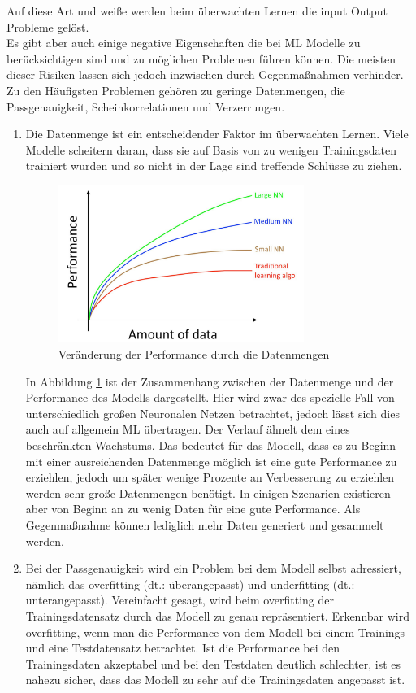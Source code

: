 \begin{onehalfspace}
        Auf diese Art und weiße werden beim überwachten Lernen die input Output Probleme gelöst. \cite{Ng2018}
        \\
        Es gibt aber auch einige negative Eigenschaften die bei \ac{ML} Modelle zu berücksichtigen sind und zu möglichen Problemen führen können. Die meisten dieser Risiken lassen sich jedoch inzwischen durch Gegenmaßnahmen verhinder. Zu den Häufigsten Problemen gehören zu geringe Datenmengen, die Passgenauigkeit, Scheinkorrelationen und Verzerrungen. 
        \begin{enumerate}
            \item Die Datenmenge ist ein entscheidender Faktor im überwachten Lernen. Viele Modelle scheitern daran, dass sie auf Basis von zu wenigen Trainingsdaten trainiert wurden und so nicht in der Lage sind treffende Schlüsse zu ziehen. \cite{Datenkommission2019}\cite{Ng2018}
            \begin{figure}[h]
                \centering
                \includegraphics[width = 8cm]{Bilder/Datenmenge.png}
                \caption{Veränderung der Performance durch die Datenmengen \cite{Ng2018}}
                \label{fig:Datavolume}
            \end{figure} 
            In Abbildung \ref*{fig:Datavolume} ist der Zusammenhang zwischen der Datenmenge und der Performance des Modells dargestellt. Hier wird zwar des spezielle Fall von unterschiedlich großen Neuronalen Netzen betrachtet, jedoch lässt sich dies auch auf allgemein \ac*{ML} übertragen. Der Verlauf ähnelt dem eines beschränkten Wachstums. Das bedeutet für das Modell, dass es zu Beginn mit einer ausreichenden Datenmenge möglich ist eine gute Performance zu erziehlen, jedoch um später wenige Prozente an Verbesserung zu erziehlen werden sehr große Datenmengen benötigt.\cite{Ng2018} In einigen Szenarien existieren aber von Beginn an zu wenig Daten für eine gute Performance. Als Gegenmaßnahme können lediglich mehr Daten generiert und gesammelt werden.
            \item Bei der Passgenauigkeit wird ein Problem bei dem Modell selbst adressiert, nämlich das overfitting (\ac*{dt}.: \glqq{}überangepasst\grqq{}) und underfitting (\ac*{dt}.: \glqq{}unterangepasst\grqq{}). Vereinfacht gesagt, wird beim overfitting der Trainingsdatensatz durch das Modell zu genau repräsentiert. Erkennbar wird overfitting, wenn man die Performance von dem Modell bei einem Trainings- und eine Testdatensatz betrachtet. Ist die Performance bei den Trainingsdaten akzeptabel und bei den Testdaten deutlich schlechter, ist es nahezu sicher, dass das Modell zu sehr auf die Trainingsdaten angepasst ist.

\end{enumerate}
\end{onehalfspace}
